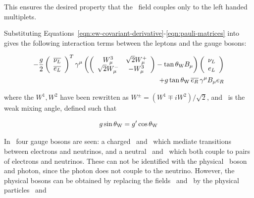 This ensures the desired property that the \sutwo\ field
couples only to the left handed multiplets. 


Substituting Equations~\ref{eqn:ew-covariant-derivative}-\ref{eqn:pauli-matrices}
 into~ gives the following
interaction terms between the leptons and the gauge bosons:

\begin{equation}
\begin{split}
- \frac{g}{2}
\left( \begin{array}{c}\overline{\nu_{L}} \\  \overline{e_{L}} \end{array} \right)^{T}
\gamma^{\mu} \left(
\left( \begin{array}{cc} W^{3}_{\mu} & \sqrt{2} W^{+}_{\mu} \\ \sqrt{2} W^{-}_{\mu} & -
W^{3}_{\mu} \end{array} \right)
- \tan{\ensuremath{\theta_{\mathrm{W}}}} B_{\mu} \right)
\left( \begin{array}{c} \nu_{L} \\  e_{L} \end{array} \right) \\
+ g \tan{\ensuremath{\theta_{\mathrm{W}}}} \, \overline{e_{R}} \, \gamma^{\mu} B_{\mu} e_{R}
\end{split}
\label{eqn:ew-lepton-interactions}
\end{equation}

where the $W^{1}, W^{2}$ have been rewritten as $W^{\pm} = (W^{1} \mp
iW^{2})/\sqrt{2}$, and \thetaW\ is the weak mixing angle, defined such that

\begin{equation}
g \sin{\ensuremath{\theta_{\mathrm{W}}}} = g' \cos{\ensuremath{\theta_{\mathrm{W}}}}
\end{equation}

In~ four gauge bosons are seen: a charged \Wp\ and
\Wm\ which mediate transitions between electrons and neutrinos, and a neutral
\Wthreemu\ and \Bmu\ which both couple to pairs of electrons and neutrinos.
These can not be identified with the physical \Z\ boson and photon, since the
photon does not couple to the neutrino.  However, the physical bosons can be obtained by replacing the fields \Wthreemu\ and \Bmu\ by the
physical particles \Zmu\ and \Amu

